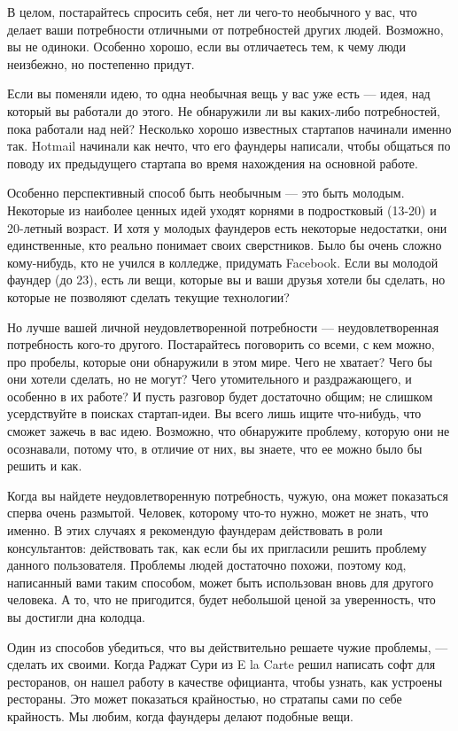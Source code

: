 \documentclass[ebook,12pt,oneside,openany]{memoir}
\begin{document}
В целом, постарайтесь спросить себя, нет ли чего-то необычного у вас,
что делает ваши потребности отличными от потребностей других людей.
Возможно, вы не одиноки. Особенно хорошо, если вы отличаетесь тем, к
чему люди неизбежно, но постепенно придут.

Если вы поменяли идею, то одна необычная вещь у вас уже есть — идея,
над который вы работали до этого. Не обнаружили ли вы каких-либо
потребностей, пока работали над ней? Несколько хорошо известных
стартапов начинали именно так. Hotmail начинали как нечто, что его
фаундеры написали, чтобы общаться по поводу их предыдущего стартапа во
время нахождения на основной работе.

Особенно перспективный способ быть необычным — это быть молодым.
Некоторые из наиболее ценных идей уходят корнями в подростковый
(13-20) и 20-летный возраст. И хотя у молодых фаундеров есть некоторые
недостатки, они единственные, кто реально понимает своих сверстников.
Было бы очень сложно кому-нибудь, кто не учился в колледже, придумать
Facebook. Если вы молодой фаундер (до 23), есть ли вещи, которые вы и
ваши друзья хотели бы сделать, но которые не позволяют сделать текущие
технологии?

Но лучше вашей личной неудовлетворенной потребности —
неудовлетворенная потребность кого-то другого. Постарайтесь поговорить
со всеми, с кем можно, про пробелы, которые они обнаружили в этом
мире. Чего не хватает? Чего бы они хотели сделать, но не могут? Чего
утомительного и раздражающего, и особенно в их работе? И пусть
разговор будет достаточно общим; не слишком усердствуйте в поисках
стартап-идеи. Вы всего лишь ищите что-нибудь, что сможет зажечь в вас
идею. Возможно, что обнаружите проблему, которую они не осознавали,
потому что, в отличие от них, вы знаете, что ее можно было бы решить и
как.

Когда вы найдете неудовлетворенную потребность, чужую, она может
показаться сперва очень размытой. Человек, которому что-то нужно,
может не знать, что именно. В этих случаях я рекомендую фаундерам
действовать в роли консультантов: действовать так, как если бы их
пригласили решить проблему данного пользователя. Проблемы людей
достаточно похожи, поэтому код, написанный вами таким способом, может
быть использован вновь для другого человека. А то, что не пригодится,
будет небольшой ценой за уверенность, что вы достигли дна колодца.

Один из способов убедиться, что вы действительно решаете чужие
проблемы, — сделать их своими. Когда Раджат Сури из E la Carte решил
написать софт для ресторанов, он нашел работу в качестве официанта,
чтобы узнать, как устроены рестораны. Это может показаться крайностью,
но стратапы сами по себе крайность. Мы любим, когда фаундеры делают
подобные вещи.
\end{document}
